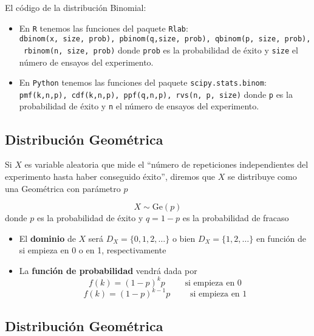 \documentclass[
]{article}
\providecommand{\tightlist}{%
  \setlength{\itemsep}{0pt}\setlength{\parskip}{0pt}}
\begin{document}
El código de la distribución Binomial:

\begin{itemize}
\tightlist
\item
  En \texttt{R} tenemos las funciones del paquete \texttt{Rlab}:
  \texttt{dbinom(x,\ size,\ prob),\ pbinom(q,size,\ prob),\ qbinom(p,\ size,\ prob),\ rbinom(n,\ size,\ prob)}
  donde \texttt{prob} es la probabilidad de éxito y \texttt{size} el
  número de ensayos del experimento.
\item
  En \texttt{Python} tenemos las funciones del paquete
  \texttt{scipy.stats.binom}:
  \texttt{pmf(k,n,p),\ cdf(k,n,p),\ ppf(q,n,p),\ rvs(n,\ p,\ size)}
  donde \texttt{p} es la probabilidad de éxito y \texttt{n} el número de
  ensayos del experimento.
\end{itemize}

\hypertarget{distribuciuxf3n-geomuxe9trica}{%
\subsection{Distribución
Geométrica}\label{distribuciuxf3n-geomuxe9trica}}

Si \(X\) es variable aleatoria que mide el ``número de repeticiones
independientes del experimento hasta haber conseguido éxito'', diremos
que \(X\) se distribuye como una Geométrica con parámetro \(p\)

\[X\sim \text{Ge}(p)\] donde \(p\) es la probabilidad de éxito y
\(q = 1-p\) es la probabilidad de fracaso

\begin{itemize}
\item
  El \textbf{dominio} de \(X\) será \(D_X= \{0,1,2,\dots\}\) o bien
  \(D_X = \{1,2,\dots\}\) en función de si empieza en 0 o en 1,
  respectivamente
\item
  La \textbf{función de probabilidad} vendrá dada por
  \[f(k) = (1-p)^{k}p \qquad\text{ si empieza en 0}\]
  \[f(k) = (1-p)^{k-1}p \qquad\text{ si empieza en 1}\]
\end{itemize}

\hypertarget{distribuciuxf3n-geomuxe9trica-1}{%
\subsection{Distribución
Geométrica}\label{distribuciuxf3n-geomuxe9trica-1}}
\end{document}
